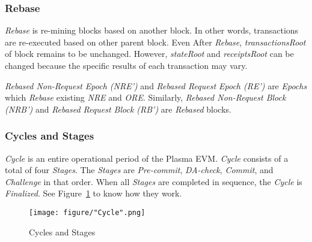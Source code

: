 \documentclass[letterpaper, 11pt]{article}
\begin{document}
\subsubsection{Rebase}
\begin{CJK}{UTF8}{mj}
\emph{Rebase} is re-mining blocks based on another block. In other words, transactions are re-executed based on other parent block. Even After \emph{Rebase}, \emph{transactionsRoot} of block remains to be unchanged. However, \emph{stateRoot} and \emph{receiptsRoot} can be changed because the specific results of each transaction may vary.

\emph{Rebased Non-Request Epoch (NRE')} and \emph{Rebased Request Epoch (RE')} are \emph{Epochs} which \emph{Rebase} existing \emph{NRE} and \emph{ORE}. Similarly, \emph{Rebased Non-Request Block (NRB')} and \emph{Rebased Request Block (RB')} are \emph{Rebased} blocks.
\end{CJK}

\subsubsection{Cycles and Stages}
\begin{CJK}{UTF8}{mj}
\emph{Cycle} is an entire operational period of the Plasma EVM. \emph{Cycle} consists of a total of four \emph{Stages}. The \emph{Stages} are \emph{Pre-commit}, \emph{DA-check}, \emph{Commit}, and \emph{Challenge} in that order. When all \emph{Stages} are completed in sequence, the \emph{Cycle} is \emph{Finalized}. See Figure~\ref{fig:cycle} to know how they work.

\begin{figure}[!h]
\centering
\texttt{[image: figure/"Cycle".png]}
\caption{Cycles and Stages}
\label{fig:cycle}
\end{figure}

\end{CJK}
\end{document}
